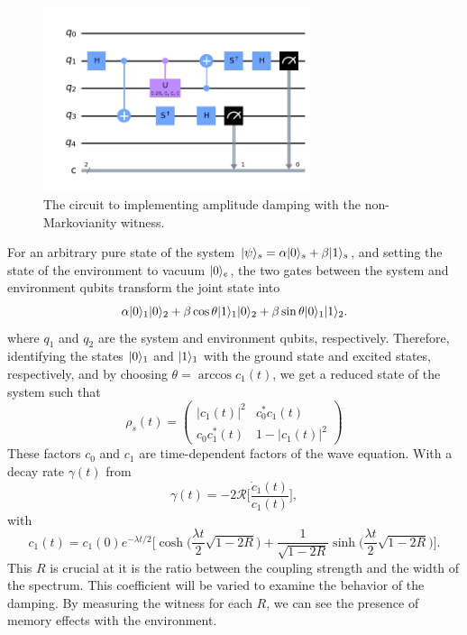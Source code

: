 \documentclass[12pt]{article}
\newcommand*{\eu}{e}
\DeclarePairedDelimiter{\ket}{\lvert}{\rangle}
\begin{document}
  \begin{figure}
    \centering
    \includegraphics[width=0.7\textwidth]{images/amplitude_damping_yy_circuit.png}
    \caption{The circuit to implementing amplitude damping with the non-Markovianity witness.%
      \label{fig:amplitude_damping_circuit}}
  \end{figure}
  For an arbitrary pure state of the system \( \ket{\psi}_{s} = \alpha \ket{0}_{s} + \beta \ket{1}_{s} \), and setting the state of the environment to vacuum \( \ket{0}_{e} \), the two gates between the system and environment qubits transform the joint state into
  \begin{equation}
    \alpha \ket{0}_{1} \ket{0}_{2} + \beta \cos \theta \ket{1}_{1} \ket{0}_{2}
    + \beta \sin \theta \ket{0}_{1} \ket{1}_{2}.
  \end{equation}
  where \( q_{1} \) and \( q_{2} \) are the system and environment qubits, respectively. Therefore, identifying the states \( \ket{0}_{1} \) and \( \ket{1}_{1} \) with the ground state and excited states, respectively, and by choosing \( \theta = \arccos c_{1}(t) \), we get a reduced state of the system such that
  \begin{equation}
    \rho_{s}(t)
      = \begin{pmatrix}
          \lvert c_{1}(t) \rvert^{2} & c_{0}^{*} c_{1}(t)             \\
          c_{0} c_{1}^{*}(t)         & 1 - \lvert c_{1}(t) \rvert^{2}
        \end{pmatrix}
  \end{equation}
  These factors \( c_{0} \) and \( c_{1} \) are time-dependent factors of the wave equation. With a decay rate \( \gamma(t) \) from
  \begin{equation}
    \gamma(t) = -2 \mathcal{R} \biggl[ \frac{\dot{c}_{1}(t)}{c_{1}(t)} \biggr],
  \end{equation}
  with
  \begin{equation}
    c_{1}(t)
      = c_{1}(0) \eu^{-\lambda t / 2}
        \biggl[
          \cosh \biggl( \frac{\lambda t}{2} \sqrt{1 - 2 R} \biggr)
          + \frac{1}{\sqrt{1 - 2 R}}
            \sinh \biggl( \frac{\lambda t}{2} \sqrt{1 - 2 R} \biggr)
        \biggr].
  \end{equation}
  This \( R \) is crucial at it is the ratio between the coupling strength and the width of the spectrum. This coefficient will be varied to examine the behavior of the damping. By measuring the witness for each \( R \), we can see the presence of memory effects with the environment.
\end{document}
